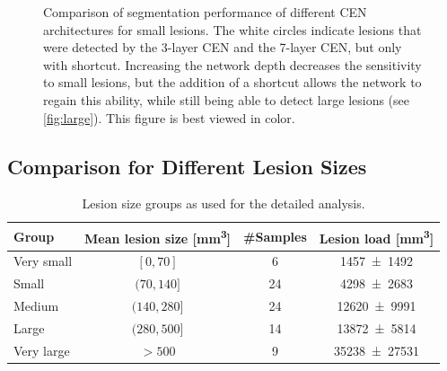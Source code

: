 \begin{figure}[p]
\caption[Comparison of segmentation performance of different CEN architectures
for small lesions]{Comparison of segmentation performance of different CEN architectures
for small lesions. The white circles indicate lesions that were detected by the
3-layer CEN and the 7-layer CEN, but only with shortcut. Increasing the network
depth decreases the sensitivity to small lesions, but the addition of a
shortcut allows the network to regain this ability, while still being able to
detect large lesions (see \ref{fig:large}). This figure is best viewed in
color.}
\label{fig:small}
\end{figure}

\subsection[Comparison for different lesion sizes]{Comparison for Different
Lesion Sizes}

\begin{table}[tb]
\caption{Lesion size groups as used for the detailed analysis.}
\label{tab:groups}
\centering
\begin{tabular}{@{}lccc@{}}
\toprule
Group & Mean lesion size [\si{\cubic\milli\metre}] & \#Samples & Lesion
load [\si{\cubic\milli\metre}] \\
\midrule
Very small & $[0,70]$ & 6 & \num{1457+-1492} \\
Small      & $(70,140]$ & 24 & \num{4298+-2683} \\
Medium & $(140,280]$ & 24 & \num{12620+-9991} \\
Large & $(280,500]$ & 14 & \num{13872+-5814} \\
Very large & $> 500$ & 9 & \num{35238+-27531} \\
\bottomrule
\end{tabular}
\end{table}

